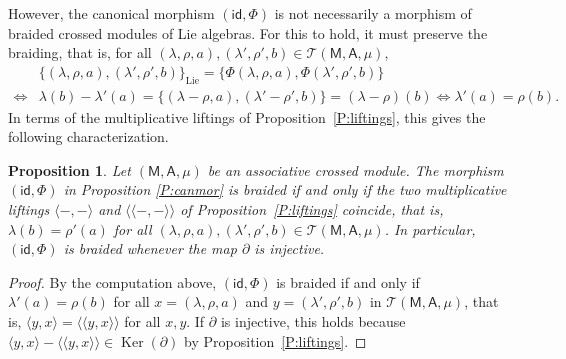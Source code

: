 \documentclass[12pt,reqno]{amsart}
\theoremstyle{plain}
\newtheorem{proposition}[theorem]{Proposition}
\theoremstyle{definition}
\theoremstyle{remark}
\def\lam{\lambda}
\def\Ker{\operatorname{Ker}}
\newcommand{\A}{\ensuremath{\mathsf{A}}}
\newcommand{\id}{\ensuremath{\mathsf{id}}}
\newcommand{\MM}{\ensuremath{\mathsf{M}}}
\newcommand{\T}{\ensuremath{\mathcal{T}}}
\numberwithin{equation}{section}
\begin{document}
However, the canonical morphism $( \id,\Phi)$ is not necessarily a morphism of braided crossed modules of Lie algebras. For this to hold,
 it must preserve the braiding, that is, for all $(\lambda,\rho,a),(\lambda',\rho',b)\in\T(\MM,\A,\mu)$,
\begin{align*}
	&\{(\lambda,\rho,a),(\lambda',\rho',b)\}_{\text{Lie}}=\{\Phi(\lambda,\rho,a),\Phi(\lambda',\rho',b)\}\\
	\iff&\lambda(b)-\lambda'(a)=\{(\lambda-\rho,a),(\lambda'-\rho',b)\}=(\lambda-\rho)(b)\iff\lambda'(a)=\rho(b).
\end{align*}
In terms of the multiplicative liftings of Proposition~\ref{P:liftings}, this gives the following characterization.
\begin{proposition}\label{P:braided-iff}
	Let $(\MM,\A,\mu)$ be an associative crossed module. The morphism $(\id,\Phi)$ in Proposition \ref{P:canmor} is braided if and only if
	 the two multiplicative liftings $\langle-,-\rangle$ and $\langle\!\langle-,-\rangle\!\rangle$ of Proposition~\ref{P:liftings} coincide,
	  that is, $\lam(b)=\rho'(a)$ for all $(\lambda,\rho,a),(\lambda',\rho',b)\in\T(\MM,\A,\mu)$. In particular, $(\id,\Phi)$ is braided whenever the map $\partial$ is injective.
\end{proposition}
\begin{proof}
	By the computation above, $(\id,\Phi)$ is braided if and only if $\lam'(a)=\rho(b)$ for all $x=(\lambda,\rho,a)$ and $y=(\lambda',\rho',b)$ in $\T(\MM,\A,\mu)$,
	 that is, $\langle y,x\rangle=\langle\!\langle y,x\rangle\!\rangle$ for all $x,y$. If $\partial$ is injective, this holds because
	  $\langle y,x\rangle-\langle\!\langle y,x\rangle\!\rangle\in\Ker(\partial)$ by Proposition~\ref{P:liftings}.
\end{proof}
\end{document}
